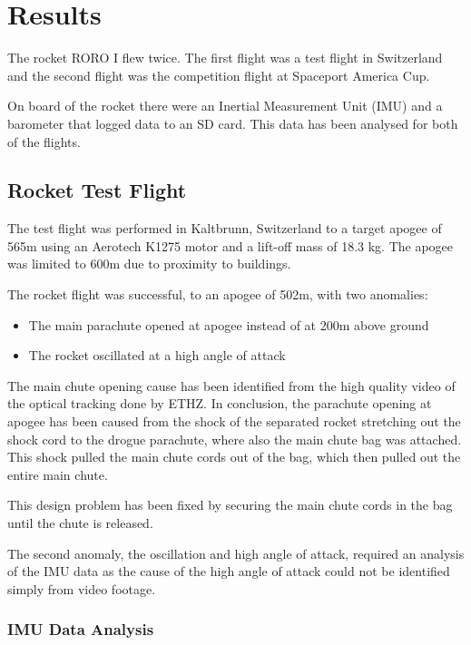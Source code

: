 \section{Results}
\label{sec:results}

The rocket RORO I flew twice. The first flight was a test flight in Switzerland and the second flight was the competition flight at Spaceport America Cup.

On board of the rocket there were an Inertial Measurement Unit (IMU) and a barometer that logged data to an SD card.
This data has been analysed for both of the flights.

\subsection{Rocket Test Flight}
\label{subsection:flightTests}

The test flight was performed in Kaltbrunn, Switzerland to a target apogee of 565m using an Aerotech K1275 motor and a lift-off mass of 18.3 kg. The apogee was limited to 600m due to proximity to buildings.

The rocket flight was successful, to an apogee of 502m, with two anomalies:
\begin{itemize}
    \item The main parachute opened at apogee instead of at 200m above ground
    \item The rocket oscillated at a high angle of attack
\end{itemize}

The main chute opening cause has been identified from the high quality video of the optical tracking done by ETHZ.
In conclusion, the parachute opening at apogee has been caused from the shock of the separated rocket stretching out the shock cord to the drogue parachute, where also the main chute bag was attached.
This shock pulled the main chute cords out of the bag, which then pulled out the entire main chute.

This design problem has been fixed by securing the main chute cords in the bag until the chute is released.

The second anomaly, the oscillation and high angle of attack, required an analysis of the IMU data as the cause of the high angle of attack could not be identified simply from video footage.

\subsubsection{IMU Data Analysis}

